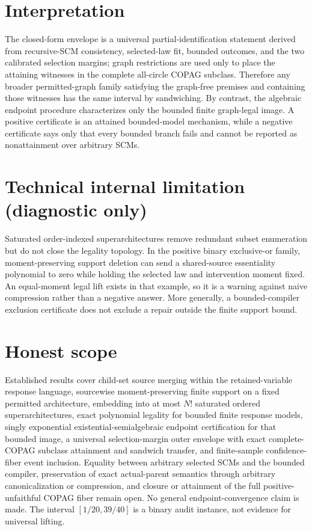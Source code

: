 \documentclass{article}
\begin{document}
\section{Interpretation}

The closed-form envelope is a universal partial-identification statement derived from recursive-SCM consistency, selected-law fit, bounded outcomes, and the two calibrated selection margins; graph restrictions are used only to place the attaining witnesses in the complete all-circle COPAG subclass.  Therefore any broader permitted-graph family satisfying the graph-free premises and containing those witnesses has the same interval by sandwiching.  By contrast, the algebraic endpoint procedure characterizes only the bounded finite graph-legal image.  A positive certificate is an attained bounded-model mechanism, while a negative certificate says only that every bounded branch fails and cannot be reported as nonattainment over arbitrary SCMs.

\section*{Technical internal limitation (diagnostic only)}

Saturated order-indexed superarchitectures remove redundant subset enumeration but do not close the legality topology.  In the positive binary exclusive-or family, moment-preserving support deletion can send a shared-source essentiality polynomial to zero while holding the selected law and intervention moment fixed.  An equal-moment legal lift exists in that example, so it is a warning against naive compression rather than a negative answer.  More generally, a bounded-compiler exclusion certificate does not exclude a repair outside the finite support bound.

\section{Honest scope}

Established results cover child-set source merging within the retained-variable response language, sourcewise moment-preserving finite support on a fixed permitted architecture, embedding into at most \(N!\) saturated ordered superarchitectures, exact polynomial legality for bounded finite response models, singly exponential existential-semialgebraic endpoint certification for that bounded image, a universal selection-margin outer envelope with exact complete-COPAG subclass attainment and sandwich transfer, and finite-sample confidence-fiber event inclusion.  Equality between arbitrary selected SCMs and the bounded compiler, preservation of exact actual-parent semantics through arbitrary canonicalization or compression, and closure or attainment of the full positive-unfaithful COPAG fiber remain open.  No general endpoint-convergence claim is made.  The interval \(\left[1/20,39/40\right]\) is a binary audit instance, not evidence for universal lifting.
\end{document}
